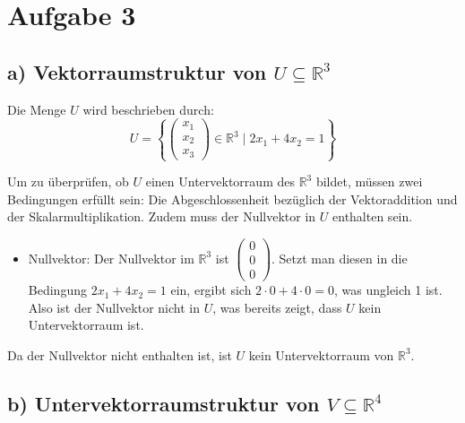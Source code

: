 \documentclass[a4paper]{scrartcl}
\begin{document}
\section*{Aufgabe 3}
\subsection*{a) Vektorraumstruktur von $U \subseteq \mathbb{R}^3$}

Die Menge $U$ wird beschrieben durch:
\[ U = \left\{ \begin{pmatrix} x_1 \\ x_2 \\ x_3 \end{pmatrix} \in \mathbb{R}^3 \mid 2x_1 + 4x_2 = 1 \right\} \]

Um zu überprüfen, ob $U$ einen Untervektorraum des $\mathbb{R}^3$ bildet, müssen zwei Bedingungen erfüllt sein: Die Abgeschlossenheit bezüglich der Vektoraddition und der Skalarmultiplikation. Zudem muss der Nullvektor in $U$ enthalten sein.

\begin{itemize}
    \item Nullvektor: Der Nullvektor im $\mathbb{R}^3$ ist $\begin{pmatrix} 0 \\ 0 \\ 0 \end{pmatrix}$. Setzt man diesen in die Bedingung $2x_1 + 4x_2 = 1$ ein, ergibt sich $2 \cdot 0 + 4 \cdot 0 = 0$, was ungleich 1 ist. Also ist der Nullvektor nicht in $U$, was bereits zeigt, dass $U$ kein Untervektorraum ist.
\end{itemize}

Da der Nullvektor nicht enthalten ist, ist $U$ kein Untervektorraum von $\mathbb{R}^3$.

\subsection*{b) Untervektorraumstruktur von $V \subseteq \mathbb{R}^4$}
\end{document}
